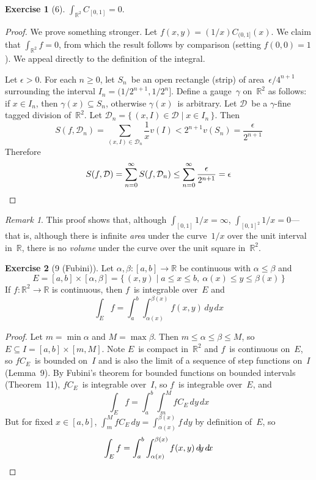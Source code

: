 \documentclass[letterpaper,12pt]{article}
\newcommand{\R}{\mathbb{R}}
\newcommand{\D}{\mathcal{D}}
\renewcommand{\d}[1]{\,d\!{#1}}
\newcommand{\dx}{\d{x}}
\newcommand{\dy}{\d{y}}
\theoremstyle{plain}
\theoremstyle{definition}
\newtheorem*{exer}{Exercise}
\theoremstyle{remark}
\newtheorem*{rmk}{Remark}
\begin{document}
\begin{exer}[6]
\(\int_{\R^2}C_{[0,1]}=0\).
\end{exer}
\begin{proof}
We prove something stronger. Let \(f(x,y)=(1/x)C_{(0,1]}(x)\). We claim that \(\int_{\R^2}f=0\), from which the result follows by comparison (setting \(f(0,0)=1\)). We appeal directly to the definition of the integral.

Let \(\epsilon>0\). For each \(n\ge 0\), let \(S_n\)~be an open rectangle (strip) of area~\(\epsilon/4^{n+1}\) surrounding the interval \(I_n=(1/2^{n+1},1/2^n]\). Define a gauge~\(\gamma\) on~\(\R^2\) as follows: if \(x\in I_n\), then \(\gamma(x)\subseteq S_n\), otherwise \(\gamma(x)\)~is arbitrary. Let \(\D\)~be a \(\gamma\)-fine tagged division of~\(\R^2\). Let \(\D_n=\{\,(x,I)\in\D\mid x\in I_n\,\}\). Then
\[S(f,\D_n)=\sum_{(x,I)\in\D_n}\frac{1}{x}v(I)<2^{n+1}v(S_n)=\frac{\epsilon}{2^{n+1}}\]
Therefore
\[S(f,\D)=\sum_{n=0}^{\infty}S(f,\D_n)\le\sum_{n=0}^{\infty}\frac{\epsilon}{2^{n+1}}=\epsilon\qedhere\]
\end{proof}
\begin{rmk}
This proof shows that, although \(\int_{[0,1]}1/x=\infty\), \(\int_{[0,1]^2}1/x=0\)---that is, although there is infinite \emph{area} under the curve~\(1/x\) over the unit interval in~\(\R\), there is no \emph{volume} under the curve over the unit square in~\(\R^2\).
\end{rmk}

\begin{exer}[9 (Fubini)]
Let \(\alpha,\beta:[a,b]\to\R\) be continuous with \(\alpha\le\beta\) and
\[E=[a,b]\times[\alpha,\beta]=\{\,(x,y)\mid a\le x\le b,\ \alpha(x)\le y\le\beta(x)\,\}\]
If \(f:\R^2\to\R\) is continuous, then \(f\)~is integrable over~\(E\) and
\[\int_E f=\int_a^b\int_{\alpha(x)}^{\beta(x)}f(x,y)\dy\dx\]
\end{exer}
\begin{proof}
Let \(m=\min\alpha\) and \(M=\max\beta\). Then \(m\le\alpha\le\beta\le M\), so \(E\subseteq I=[a,b]\times[m,M]\). Note \(E\)~is compact in~\(\R^2\) and \(f\)~is continuous on~\(E\), so \(fC_E\)~is bounded on~\(I\) and is also the limit of a sequence of step functions on~\(I\) (Lemma~9). By Fubini's theorem for bounded functions on bounded intervals (Theorem~11), \(fC_E\)~is integrable over~\(I\), so \(f\)~is integrable over~\(E\), and
\[\int_E f=\int_a^b\int_m^M fC_E\dy\dx\]
But for fixed \(x\in[a,b]\), \(\int_m^M fC_E\dy=\int_{\alpha(x)}^{\beta(x)}f\dy\) by definition of~\(E\), so
\[\int_E f=\int_a^b\int_{\alpha(x)}^{\beta(x)}f(x,y)\dy\dx\qedhere\]
\end{proof}
\end{document}

